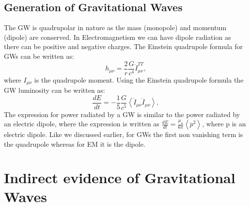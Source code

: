 \documentclass{ttuthes2007}
\begin{document}
\subsection{Generation of Gravitational Waves}
	The \ac{GW} is quadrupolar in nature as the mass (monopole) and
momentum (dipole) are conserved. In Electromagnetism we can have dipole
radiation as there can be positive and negative charges.
The Einstein quadrupole formula for \acp{GW} can be written as:
\begin{equation}\label{eg:strainamplitude}
h_{\mu\nu}= \frac{2}{r}\frac{G}{c^4}\ddot{I}_{\mu\nu}^{TT},
\end{equation}
where $I_{\mu\nu}$ is the quadrupole moment.
Using the Einstein quadrupole formula the \ac{GW} luminosity can be written
as:
\begin{equation}
\frac{dE}{dt} =
-\frac{1}{5}\frac{G}{c^5}\left\langle\dddot{I}_{\mu\nu}\dddot{I}_{\mu\nu}\right\rangle,
\end{equation}
The expression for power radiated by a \ac{GW} is similar to the power radiated
by an electric
dipole, where the expression is written as
$\frac{dE}{dt}=\frac{\mu_o}{6\pi}\left\langle \ddot{p}^2\right\rangle$, where p is an electric
dipole. Like we discussed earlier, for \acp{GW} the first non vanishing term is
the quadrupole whereas for \ac{EM} it is the dipole.

\section{Indirect evidence of Gravitational Waves}
	
\end{document}
